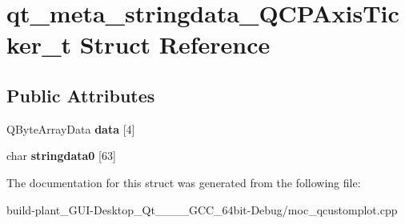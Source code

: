 \hypertarget{structqt__meta__stringdata__QCPAxisTicker__t}{}\section{qt\+\_\+meta\+\_\+stringdata\+\_\+\+Q\+C\+P\+Axis\+Ticker\+\_\+t Struct Reference}
\label{structqt__meta__stringdata__QCPAxisTicker__t}
\subsection*{Public Attributes}
\begin{DoxyCompactItemize}
\item 
\mbox{\label{structqt__meta__stringdata__QCPAxisTicker__t_a0e5e6cc358157945592776d87e7d14b4}} 
Q\+Byte\+Array\+Data {\bfseries data} \mbox{[}4\mbox{]}
\item 
\mbox{\label{structqt__meta__stringdata__QCPAxisTicker__t_a8600a85cebf0ead1c96536e854070e8b}} 
char {\bfseries stringdata0} \mbox{[}63\mbox{]}
\end{DoxyCompactItemize}


The documentation for this struct was generated from the following file\+:\begin{DoxyCompactItemize}
\item 
build-\/plant\+\_\+\+G\+U\+I-\/\+Desktop\+\_\+\+Qt\+\_\+\_\+\_\+\_\+\+G\+C\+C\+\_\+64bit-\/\+Debug/moc\+\_\+qcustomplot.\+cpp\end{DoxyCompactItemize}
